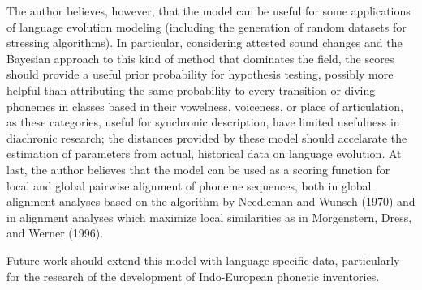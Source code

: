 \documentclass[a4paper]{article}
\begin{document}
The author believes, however, that the model can be useful for some
applications of language evolution modeling (including the generation of
random datasets for stressing algorithms). In particular, considering
attested sound changes and the Bayesian approach to this kind of method
that dominates the field, the scores should provide a useful prior
probability for hypothesis testing, possibly more helpful than
attributing the same probability to every transition or diving phonemes
in classes based in their vowelness, voiceness, or place of
articulation, as these categories, useful for synchronic description,
have limited usefulness in diachronic research; the distances provided
by these model should accelarate the estimation of parameters from
actual, historical data on language evolution. At last, the author
believes that the model can be used as a scoring function for local and
global pairwise alignment of phoneme sequences, both in global alignment
analyses based on the algorithm by Needleman and Wunsch (1970) and in
alignment analyses which maximize local similarities as in Morgenstern,
Dress, and Werner (1996).

Future work should extend this model with language specific data,
particularly for the research of the development of Indo-European
phonetic inventories.
\end{document}
